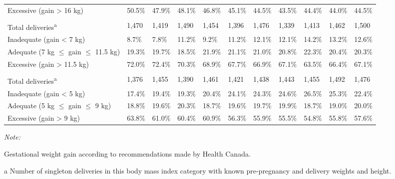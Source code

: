 \documentclass[
]{krantz}
\begin{document}
\begin{table}[H]
{\begin{threeparttable}
\begin{tabular}[t]{lllllllllll}
Excessive (gain > 16 kg) & 50.5$\%$ & 47.9$\%$ & 48.1$\%$ & 46.8$\%$ & 45.1$\%$ & 44.5$\%$ & 43.5$\%$ & 44.4$\%$ & 44.0$\%$ & 44.5$\%$\\
\cellcolor[HTML]{E1E1E1}{\textbf{Overweight}} & \cellcolor[HTML]{E1E1E1}{\textbf{}} & \cellcolor[HTML]{E1E1E1}{\textbf{}} & \cellcolor[HTML]{E1E1E1}{\textbf{}} & \cellcolor[HTML]{E1E1E1}{\textbf{}} & \cellcolor[HTML]{E1E1E1}{\textbf{}} & \cellcolor[HTML]{E1E1E1}{\textbf{}} & \cellcolor[HTML]{E1E1E1}{\textbf{}} & \cellcolor[HTML]{E1E1E1}{\textbf{}} & \cellcolor[HTML]{E1E1E1}{\textbf{}} & \cellcolor[HTML]{E1E1E1}{\textbf{}}\\
Total deliveries\textsuperscript{a} & 1,470 & 1,419 & 1,490 & 1,454 & 1,396 & 1,476 & 1,339 & 1,413 & 1,462 & 1,500\\
Inadequate (gain < 7 kg) & 8.7$\%$ & 7.8$\%$ & 11.2$\%$ & 9.2$\%$ & 11.2$\%$ & 12.1$\%$ & 12.1$\%$ & 14.2$\%$ & 13.2$\%$ & 12.6$\%$\\
Adequate (7 kg $\leq$ gain $\leq$ 11.5 kg) & 19.3$\%$ & 19.7$\%$ & 18.5$\%$ & 21.9$\%$ & 21.1$\%$ & 21.0$\%$ & 20.8$\%$ & 22.3$\%$ & 20.4$\%$ & 20.3$\%$\\
Excessive (gain > 11.5 kg) & 72.0$\%$ & 72.4$\%$ & 70.3$\%$ & 68.9$\%$ & 67.7$\%$ & 66.9$\%$ & 67.1$\%$ & 63.5$\%$ & 66.4$\%$ & 67.1$\%$\\
\cellcolor[HTML]{E1E1E1}{\textbf{Obese}} & \cellcolor[HTML]{E1E1E1}{\textbf{}} & \cellcolor[HTML]{E1E1E1}{\textbf{}} & \cellcolor[HTML]{E1E1E1}{\textbf{}} & \cellcolor[HTML]{E1E1E1}{\textbf{}} & \cellcolor[HTML]{E1E1E1}{\textbf{}} & \cellcolor[HTML]{E1E1E1}{\textbf{}} & \cellcolor[HTML]{E1E1E1}{\textbf{}} & \cellcolor[HTML]{E1E1E1}{\textbf{}} & \cellcolor[HTML]{E1E1E1}{\textbf{}} & \cellcolor[HTML]{E1E1E1}{\textbf{}}\\
Total deliveries\textsuperscript{a} & 1,376 & 1,455 & 1,390 & 1,461 & 1,421 & 1,438 & 1,443 & 1,455 & 1,492 & 1,476\\
Inadequate (gain < 5 kg) & 17.4$\%$ & 19.4$\%$ & 19.3$\%$ & 20.4$\%$ & 24.1$\%$ & 24.3$\%$ & 24.6$\%$ & 26.5$\%$ & 25.3$\%$ & 22.4$\%$\\
Adequate (5 kg $\leq$ gain $\leq$ 9 kg) & 18.8$\%$ & 19.6$\%$ & 20.3$\%$ & 18.7$\%$ & 19.6$\%$ & 19.7$\%$ & 19.9$\%$ & 18.7$\%$ & 19.0$\%$ & 20.0$\%$\\
Excessive (gain > 9 kg) & 63.8$\%$ & 61.0$\%$ & 60.4$\%$ & 60.9$\%$ & 56.3$\%$ & 55.9$\%$ & 55.5$\%$ & 54.8$\%$ & 55.8$\%$ & 57.6$\%$\\
\bottomrule
\end{tabular}
\begin{tablenotes}
\item \textit{Note: } 
\item Gestational weight gain according to recommendations made by Health Canada.
\item[a] Number of singleton deliveries in this body mass index category with known pre-pregnancy and delivery weights and height.
\end{tablenotes}
\end{threeparttable}}
\end{table}
\end{document}
